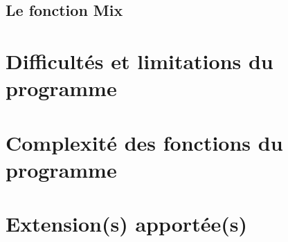\documentclass[a4paper,12pt]{article}
\begin{document}
\subsection{Le fonction Mix}

\section{Difficultés et limitations du programme}

\section{Complexité des fonctions du programme}

\section{Extension(s) apportée(s)}
\end{document}
